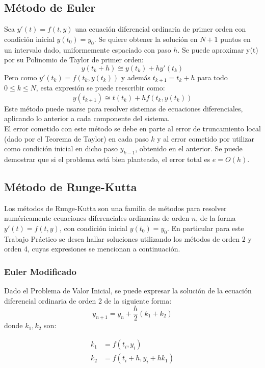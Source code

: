 \documentclass[titlepage,a4paper]{article}
\begin{document}
	\subsection{Método de Euler}
	Sea $ y'(t) = f(t, y) $ una ecuación diferencial ordinaria de primer orden con condición inicial $ y(t_{0}) = y_{0} $. Se quiere obtener la solución en $ N + 1 $ puntos en un intervalo dado, uniformemente espaciado con paso $h$. 
	Se puede aproximar y(t) por su Polinomio de Taylor de primer orden:
	\begin{equation}
		y(t_{k} + h) \cong y(t_{k}) + hy'(t_{k})
	\end{equation}
	Pero como $y'(t_{k}) = f(t_{k}, y(t_{k}))$ y además $ t_{k+1} = t_{k} + h $ para todo $ 0 \leq k \leq N $, esta expresión se puede reescribir como:
	\begin{equation}
		y(t_{k+1}) \cong t(t_{k}) + hf(t_{k}, y(t_{k}))
	\end{equation}
	Este método puede usarse para resolver sistemas de ecuaciones diferenciales,  aplicando lo anterior a cada componente del sistema.\\
	El error cometido con este método se debe en parte al error de truncamiento local (dado por el Teorema de Taylor) en cada paso $k$ y al error cometido por utilizar como condición inicial en dicho paso $ y_{k-1} $, obtenido en el anterior. Se puede demostrar que si el problema está bien planteado, el error total es $ e = O(h) $.
	\subsection{Método de Runge-Kutta}
	Los métodos de Runge-Kutta son una familia de métodos para resolver numéricamente ecuaciones diferenciales ordinarias de orden $ n $, de la forma $ y'(t) = f(t, y) $, con condición inicial $ y(t_{0}) = y_{0} $.
	En particular para este Trabajo Práctico se desea hallar soluciones utilizando los métodos de orden 2 y orden 4, cuyas expresiones se mencionan a continuación.
	\subsubsection{Euler Modificado}
	Dado el Problema de Valor Inicial, se puede expresar la solución de la ecuación diferencial ordinaria de orden 2 de la siguiente forma:
	\begin{equation}
		y_{n+1} = y_n + \frac{h}{2} (k_1 + k_2)
	\end{equation}
	donde $ k_1, k_2 $ son:

	\begin{align*}
		k_1 &= f(t_i, y_i)\\
		k_2 &= f(t_i + h, y_i + hk_1)
	\end{align*}
\end{document}

